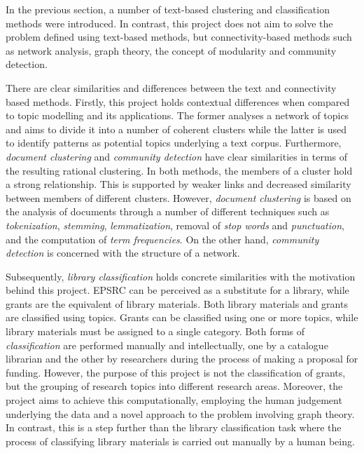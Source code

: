 In the previous section, a number of text-based clustering and classification methods were introduced. In contrast, this project does not aim to solve the problem defined using text-based methods, but connectivity-based methods such as network analysis, graph theory, the concept of modularity and community detection.

There are clear similarities and differences between the text and connectivity based methods. Firstly, this project holds contextual differences when compared to topic modelling and its applications. The former analyses a network of topics and aims to divide it into a number of coherent clusters while the latter is used to identify patterns as potential topics underlying a text corpus. Furthermore, \textit{document clustering} and \textit{community detection} have clear similarities in terms of the resulting rational clustering. In both methods, the members of a cluster hold a strong relationship. This is supported by weaker links and decreased similarity between members of different clusters. However, \textit{document clustering} is based on the analysis of documents through a number of different techniques such as \textit{tokenization}, \textit{stemming}, \textit{lemmatization}, removal of \textit{stop words} and \textit{punctuation}, and the computation of \textit{term frequencies}. On the other hand, \textit{community detection} is concerned with the structure of a network.

Subsequently, \textit{library classification} holds concrete similarities with the motivation behind this project. EPSRC can be perceived as a substitute for a library, while grants are the equivalent of library materials. Both library materials and grants are classified using topics. Grants can be classified using one or more topics, while library materials must be assigned to a single category. Both forms of \textit{classification} are performed manually and intellectually, one by a catalogue librarian and the other by researchers during the process of making a proposal for funding. However, the purpose of this project is not the classification of grants, but the grouping of research topics into different research areas. Moreover, the project aims to achieve this computationally, employing the human judgement underlying the data and a novel approach to the problem involving graph theory. In contrast, this is a step further than the library classification task where the process of classifying library materials is carried out manually by a human being.

